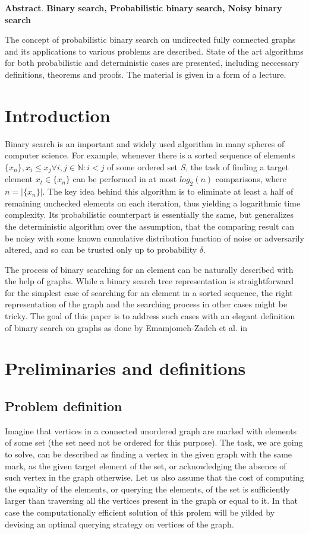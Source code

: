


\textbf{\large{Abstract}}.
\noindent \textbf{Binary search, Probabilistic binary search, Noisy binary search}

The concept of probabilistic binary search on undirected fully connected graphs and its applications to various problems are described. State of the art algorithms for both probabilistic and deterministic cases are presented, including neccessary definitions, theorems and proofs. The material is given in a form of a lecture.  

\setcounter{page}{2}
\tableofcontents

\section{Introduction}
Binary search is an important and widely used algorithm in many spheres of computer science. For example, whenever there is a sorted sequence of elements $\{x_n\}, x_i \le x_j \forall i,j \in \mathbb{N}: i < j$ of some ordered set $S$, the task of finding a target element $x_t \in \{x_n\}$ can be performed in at most $log_2(n)$ comparisons, where $n = |\{x_n\}|$. The key idea behind this algorithm is to eliminate at least a half of remaining unchecked elements on each iteration, thus yielding a logarithmic time complexity. Its probabilistic counterpart is essentially the same, but generalizes the deterministic algorithm over the assumption, that the comparing result can be noisy with some known cumulative distribution function of noise or adversarily altered, and so can be trusted only up to probability $\delta$.


The process of binary searching for an element can be naturally described with the help of graphs. While a binary search tree representation is straightforward for the simplest case of searching for an element in a sorted sequence, the right representation of the graph and the searching process in other cases might be tricky. The goal of this paper is to address such cases with an elegant definition of binary search on graphs as done by Emamjomeh-Zadeh et al. in~\cite{main}


\section{Preliminaries and definitions}
\subsection*{Problem definition}
Imagine that vertices in a connected unordered graph are marked with elements of some set (the set need not be ordered for this purpose). The task, we are going to solve, can be described as finding a vertex in the given graph with the same mark, as the given target element of the set, or acknowledging the absence of such vertex in the graph otherwise. Let us also assume that the cost of computing the equality of the elements, or querying the elements, of the set is sufficiently larger than traversing all the vertices present in the graph or equal to it. In that case the computationally efficient solution of this prolem will be yilded by devising an optimal querying strategy on vertices of the graph.


